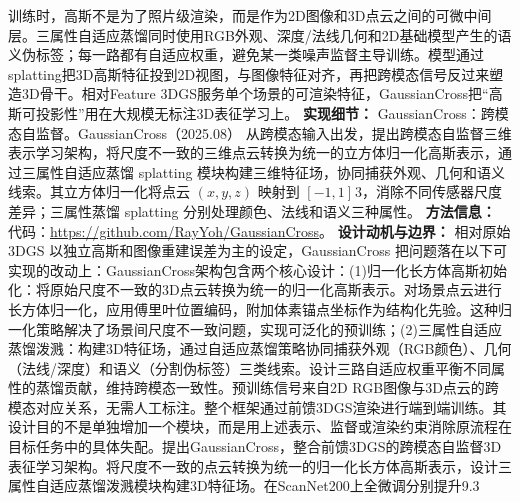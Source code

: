 训练时，高斯不是为了照片级渲染，而是作为2D图像和3D点云之间的可微中间层。三属性自适应蒸馏同时使用RGB外观、深度/法线几何和2D基础模型产生的语义伪标签；每一路都有自适应权重，避免某一类噪声监督主导训练。模型通过splatting把3D高斯特征投到2D视图，与图像特征对齐，再把跨模态信号反过来塑造3D骨干。相对Feature 3DGS服务单个场景的可渲染特征，GaussianCross把“高斯可投影性”用在大规模无标注3D表征学习上。
\textbf{实现细节：} GaussianCross：跨模态自监督。GaussianCross（2025.08） 从跨模态输入出发，提出跨模态自监督三维表示学习架构，将尺度不一致的三维点云转换为统一的立方体归一化高斯表示，通过三属性自适应蒸馏 splatting 模块构建三维特征场，协同捕获外观、几何和语义线索。其立方体归一化将点云 $(x, y, z)$ 映射到 $[-1, 1]^{}3$，消除不同传感器尺度差异；三属性蒸馏 splatting 分别处理颜色、法线和语义三种属性。
\textbf{方法信息：} 代码：\url{https://github.com/RayYoh/GaussianCross}。
\textbf{设计动机与边界：} 相对原始 3DGS 以独立高斯和图像重建误差为主的设定，GaussianCross 把问题落在以下可实现的改动上：GaussianCross架构包含两个核心设计：(1)归一化长方体高斯初始化：将原始尺度不一致的3D点云转换为统一的归一化高斯表示。对场景点云进行长方体归一化，应用傅里叶位置编码，附加体素锚点坐标作为结构化先验。这种归一化策略解决了场景间尺度不一致问题，实现可泛化的预训练；(2)三属性自适应蒸馏泼溅：构建3D特征场，通过自适应蒸馏策略协同捕获外观（RGB颜色）、几何（法线/深度）和语义（分割伪标签）三类线索。设计三路自适应权重平衡不同属性的蒸馏贡献，维持跨模态一致性。预训练信号来自2D RGB图像与3D点云的跨模态对应关系，无需人工标注。整个框架通过前馈3DGS渲染进行端到端训练。其设计目的不是单独增加一个模块，而是用上述表示、监督或渲染约束消除原流程在目标任务中的具体失配。提出GaussianCross，整合前馈3DGS的跨模态自监督3D表征学习架构。将尺度不一致的点云转换为统一的归一化长方体高斯表示，设计三属性自适应蒸馏泼溅模块构建3D特征场。在ScanNet200上全微调分别提升9.3%
